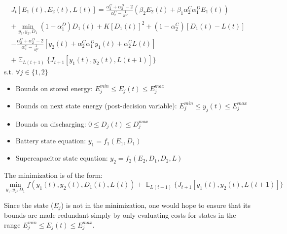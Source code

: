 \documentclass{article}
\DeclareMathOperator{\E}{\mathbb{E}}
\begin{document}
	\begin{multline}
	J_{t}[E_{1}(t),E_{2}(t),L(t)] =
	\frac{\alpha_{2}^{C}+\alpha_{2}^{D} -2}{\alpha_{2}^{C}-\frac{1}{\alpha_{1}^{D}}}(\beta_{2}E_{2}(t)+\beta_{1}\alpha_{2}^{C}\alpha_{1}^{D}E_{1}(t))\\
	+\min_{y_{1},y_{2},D_{1}}
	(1-\alpha_{1}^{D})D_{1}(t) + K[D_{1}(t)]^{2} +(1-\alpha_{2}^{C})[D_{1}(t)-L(t)]\\
	-\frac{\alpha_{2}^{C}+\alpha_{2}^{D} -2}{\alpha_{2}^{C}-\frac{1}{\alpha_{1}^{D}}}\left[y_{2}(t)+\alpha_{2}^{C}\alpha_{1}^{D}y_{1}(t)+\alpha_{2}^{C}L(t)\right]\\
	+\mathop{\E}_{L(t+1)}\{J_{t+1}[y_{1}(t),y_{2}(t),L(t+1)]\}
	\end{multline}
	s.t. $\forall j \in \{1,2\}$
	\begin{itemize}
		\item Bounds on stored energy: 
		\begin{math}E_{j}^{min}\leq E_{j}(t)\leq E_{j}^{max}\end{math}
		\item Bounds on next state energy (post-decision variable):
		\begin{math}E_{j}^{min}\leq y_{j}(t)\leq E_{j}^{max}\end{math}
		\item Bounds on discharging:
		\begin{math}0\leq D_{j}(t)\leq D_{j}^{max}\end{math}
		\item Battery state equation:
		\begin{math}y_{1}=f_{1}(E_{1},D_{1})\end{math}
		\item Supercapacitor state equation:
		\begin{math}y_{2}=f_{2}(E_{2},D_{1},D_{2},L)\end{math}
	\end{itemize}
	
	The minimization is of the form:
	\begin{displaymath}
	\min_{y_{1},y_{2},D_{1}} f(y_{1}(t),y_{2}(t),D_{1}(t),L(t)) + \mathop{\E}_{L(t+1)}\{J_{t+1}[y_{1}(t),y_{2}(t),L(t+1)]\}
	\end{displaymath}
	
	Since the state ($E_{j}$) is not in the minimization, one would hope to ensure that its bounds are made redundant simply by only evaluating costs for states in the range \begin{math}E_{j}^{min}\leq E_{j}(t)\leq E_{j}^{max}\end{math}.
	
\end{document}
